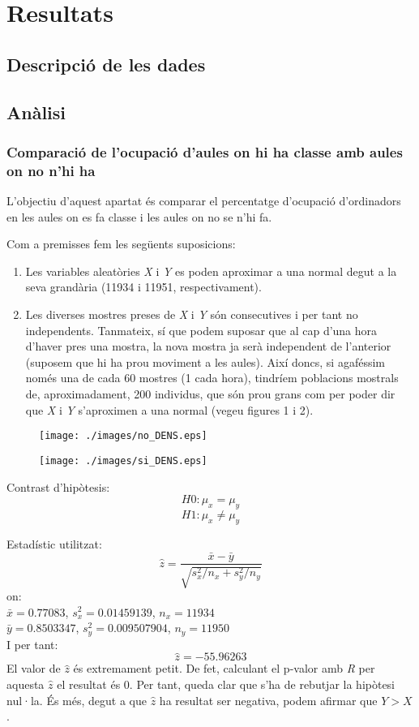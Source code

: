 \section{Resultats}
\captionsetup[figure]{labelsep=space}
\subsection{Descripció de les dades}


\subsection{Anàlisi}
\subsubsection{Comparació de l'ocupació d'aules on hi ha classe amb aules on no n'hi ha}
L'objectiu d'aquest apartat és comparar el percentatge d'ocupació d'ordinadors en les aules on es fa classe i les aules on no se n'hi fa.

Com a premisses fem les següents suposicions:
\begin{enumerate}
	\item Les variables aleatòries \emph{X} i \emph{Y} es poden aproximar a una normal degut a la seva grandària (11934 i 11951, respectivament).
	\item Les diverses mostres preses de \emph{X} i \emph{Y} són consecutives i per tant no independents. Tanmateix, sí que podem suposar que al cap d'una hora d'haver pres una mostra, la nova mostra ja serà independent de l'anterior (suposem que hi ha prou moviment a les aules). Així doncs, si agaféssim només una de cada 60 mostres (1 cada hora), tindríem poblacions mostrals de, aproximadament, 200 individus, que són prou grans com per poder dir que \emph{X} i \emph{Y} s'aproximen a una normal (vegeu figures 1 i 2).
\end{enumerate}

\begin{figure}[h!]
\begin{minipage}{0.5\linewidth}
\texttt{[image: ./images/no\_DENS.eps]}
\caption{}
\end{minipage}
\hfill
\begin{minipage}{0.5\linewidth}
\texttt{[image: ./images/si\_DENS.eps]}
\caption{}
\end{minipage}
\end{figure}

Contrast d'hipòtesis:
$$H0: \mu_x = \mu_y$$
$$H1: \mu_x \neq \mu_y$$

Estadístic utilitzat:
$$\hat{z} = \frac{\bar{x} - \bar{y}}{\sqrt{s_x^2/n_x + s_y^2/n_y}} $$
on: \\
$\bar{x} = 0.77083$,
$s^2_x = 0.01459139$,
$n_x = 11934$ \\
$\bar{y} = 0.8503347$,
$s^2_y = 0.009507904$,
$n_y = 11950$
\\

I per tant:
$$\hat{z} = -55.96263$$
El valor de $\hat{z}$ és extremament petit. De fet, calculant el p-valor amb \emph{R} per aquesta $\hat{z}$ el resultat és 0. Per tant, queda clar que s'ha de rebutjar la hipòtesi nul·la. És més, degut a que $\hat{z}$ ha resultat ser negativa, podem afirmar que $Y>X$.

